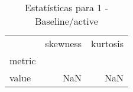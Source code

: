 \begin{table}[htbp]
\caption{Estatísticas para 1 - Baseline/active}
\label{tab:1_-_baseline_active_skewkurt}
\begin{tabular}{lrr}
\toprule
 & skewness & kurtosis \\
metric &  &  \\
\midrule
value & NaN & NaN \\
\bottomrule
\end{tabular}
\end{table}
